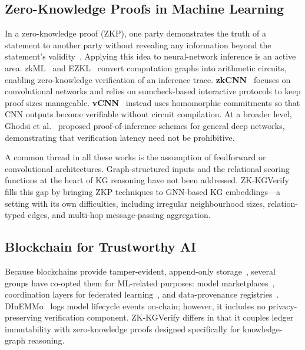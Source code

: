 \documentclass[conference, 10pt]{IEEEtran}
\begin{document}
\subsection{Zero-Knowledge Proofs in Machine Learning}

In a zero-knowledge proof (ZKP), one party demonstrates the truth of a statement to another party without revealing any information beyond the statement's validity~\cite{goldwasser1989knowledge}. Applying this idea to neural-network inference is an active area. zkML~\cite{kang2022scaling} and EZKL~\cite{ezkl2023} convert computation graphs into arithmetic circuits, enabling zero-knowledge verification of an inference trace. \textbf{zkCNN}~\cite{liu2021zkcnn} focuses on convolutional networks and relies on sumcheck-based interactive protocols to keep proof sizes manageable. \textbf{vCNN}~\cite{lee2020vcnn} instead uses homomorphic commitments so that CNN outputs become verifiable without circuit compilation. At a broader level, Ghodsi et al.~\cite{ghodsi2023zeroknowledge} proposed proof-of-inference schemes for general deep networks, demonstrating that verification latency need not be prohibitive.

A common thread in all these works is the assumption of feedforward or convolutional architectures. Graph-structured inputs and the relational scoring functions at the heart of KG reasoning have not been addressed. ZK-KGVerify fills this gap by bringing ZKP techniques to GNN-based KG embeddings---a setting with its own difficulties, including irregular neighbourhood sizes, relation-typed edges, and multi-hop message-passing aggregation.

\subsection{Blockchain for Trustworthy AI}

Because blockchains provide tamper-evident, append-only storage~\cite{nakamoto2008bitcoin, wood2014ethereum}, several groups have co-opted them for ML-related purposes: model marketplaces~\cite{kurtulmus2018trustless}, coordination layers for federated learning~\cite{kim2019blockchained}, and data-provenance registries~\cite{sarpatwar2019towards}. DInEMMo~\cite{dinEmmo2021} logs model lifecycle events on-chain; however, it includes no privacy-preserving verification component. ZK-KGVerify differs in that it couples ledger immutability with zero-knowledge proofs designed specifically for knowledge-graph reasoning.

\end{document}
